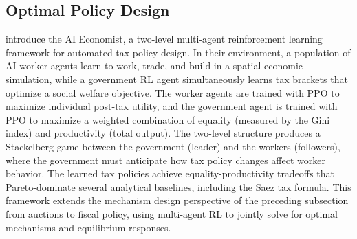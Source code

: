 \subsection{Optimal Policy Design}

\citet{Zheng2021} introduce the AI Economist, a two-level multi-agent reinforcement learning framework for automated tax policy design. In their environment, a population of AI worker agents learn to work, trade, and build in a spatial-economic simulation, while a government RL agent simultaneously learns tax brackets that optimize a social welfare objective. The worker agents are trained with PPO to maximize individual post-tax utility, and the government agent is trained with PPO to maximize a weighted combination of equality (measured by the Gini index) and productivity (total output). The two-level structure produces a Stackelberg game between the government (leader) and the workers (followers), where the government must anticipate how tax policy changes affect worker behavior. The learned tax policies achieve equality-productivity tradeoffs that Pareto-dominate several analytical baselines, including the Saez tax formula. This framework extends the mechanism design perspective of the preceding subsection from auctions to fiscal policy, using multi-agent RL to jointly solve for optimal mechanisms and equilibrium responses.
